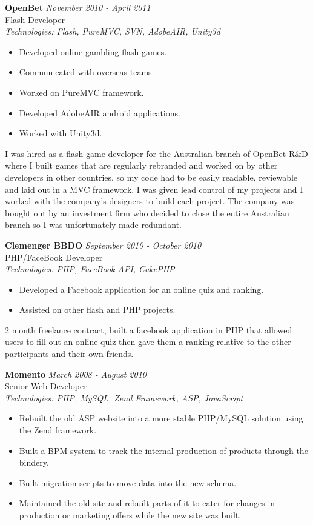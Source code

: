 \documentclass[a4paper,10pt]{article}
\begin{document}
\vspace{1em}

\textbf{OpenBet} \hfill \textit{November 2010 - April 2011} \\
Flash Developer \\
\textit{Technologies: Flash, PureMVC, SVN, AdobeAIR, Unity3d}
\begin{itemize}
    \item Developed online gambling flash games.
    \item Communicated with overseas teams.
    \item Worked on PureMVC framework.
    \item Developed AdobeAIR android applications.
    \item Worked with Unity3d.
\end{itemize}

I was hired as a flash game developer for the Australian branch of OpenBet R\&D where I built games that are regularly rebranded and worked on by other developers in other countries, so my code had to be easily readable, reviewable and laid out in a MVC framework. I was given lead control of my projects and I worked with the company's designers to build each project. The company was bought out by an investment firm who decided to close the entire Australian branch so I was unfortunately made redundant.

\vspace{1em}

\textbf{Clemenger BBDO} \hfill \textit{September 2010 - October 2010} \\
PHP/FaceBook Developer \\
\textit{Technologies: PHP, FaceBook API, CakePHP}
\begin{itemize}
    \item Developed a Facebook application for an online quiz and ranking.
    \item Assisted on other flash and PHP projects.
\end{itemize}

2 month freelance contract, built a facebook application in PHP that allowed users to fill out an online quiz then gave them a ranking relative to the other participants and their own friends.

\vspace{1em}

\textbf{Momento} \hfill \textit{March 2008 - August 2010} \\
Senior Web Developer \\
\textit{Technologies: PHP, MySQL, Zend Framework, ASP, JavaScript}
\begin{itemize}
    \item Rebuilt the old ASP website into a more stable PHP/MySQL solution using the Zend framework.
    \item Built a BPM system to track the internal production of products through the bindery.
    \item Built migration scripts to move data into the new schema.
    \item Maintained the old site and rebuilt parts of it to cater for changes in production or marketing offers while the new site was built.
\end{itemize}
\end{document}
